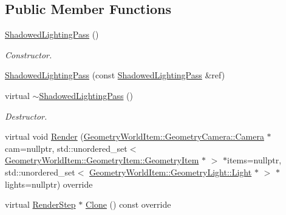 \subsection*{Public Member Functions}
\begin{DoxyCompactItemize}
\item 
\mbox{\label{class_geometry_engine_1_1_geometry_render_step_1_1_shadowed_lighting_pass_aa7ad63b588f46dd15bf660c9bd6a14f4}} 
\mbox{\hyperlink{class_geometry_engine_1_1_geometry_render_step_1_1_shadowed_lighting_pass_aa7ad63b588f46dd15bf660c9bd6a14f4}{Shadowed\+Lighting\+Pass}} ()
\begin{DoxyCompactList}\small\item\em Constructor. \end{DoxyCompactList}\item 
\mbox{\hyperlink{class_geometry_engine_1_1_geometry_render_step_1_1_shadowed_lighting_pass_abf51ceddfb91cb0749f15074cc067e12}{Shadowed\+Lighting\+Pass}} (const \mbox{\hyperlink{class_geometry_engine_1_1_geometry_render_step_1_1_shadowed_lighting_pass}{Shadowed\+Lighting\+Pass}} \&ref)
\item 
\mbox{\label{class_geometry_engine_1_1_geometry_render_step_1_1_shadowed_lighting_pass_a023b4f4a44fd25c1e0f6695a604b1f72}} 
virtual \mbox{\hyperlink{class_geometry_engine_1_1_geometry_render_step_1_1_shadowed_lighting_pass_a023b4f4a44fd25c1e0f6695a604b1f72}{$\sim$\+Shadowed\+Lighting\+Pass}} ()
\begin{DoxyCompactList}\small\item\em Destructor. \end{DoxyCompactList}\item 
virtual void \mbox{\hyperlink{class_geometry_engine_1_1_geometry_render_step_1_1_shadowed_lighting_pass_af52807435083cd96125e6ef6d7453027}{Render}} (\mbox{\hyperlink{class_geometry_engine_1_1_geometry_world_item_1_1_geometry_camera_1_1_camera}{Geometry\+World\+Item\+::\+Geometry\+Camera\+::\+Camera}} $\ast$cam=nullptr, std\+::unordered\+\_\+set$<$ \mbox{\hyperlink{class_geometry_engine_1_1_geometry_world_item_1_1_geometry_item_1_1_geometry_item}{Geometry\+World\+Item\+::\+Geometry\+Item\+::\+Geometry\+Item}} $\ast$ $>$ $\ast$items=nullptr, std\+::unordered\+\_\+set$<$ \mbox{\hyperlink{class_geometry_engine_1_1_geometry_world_item_1_1_geometry_light_1_1_light}{Geometry\+World\+Item\+::\+Geometry\+Light\+::\+Light}} $\ast$ $>$ $\ast$lights=nullptr) override
\item 
virtual \mbox{\hyperlink{class_geometry_engine_1_1_geometry_render_step_1_1_render_step}{Render\+Step}} $\ast$ \mbox{\hyperlink{class_geometry_engine_1_1_geometry_render_step_1_1_shadowed_lighting_pass_a73176d6860aee0903034eeaf93edb40d}{Clone}} () const override
\end{DoxyCompactItemize}

